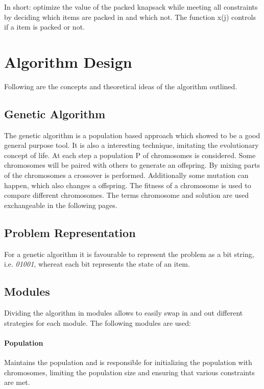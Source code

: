 \documentclass[a4paper]{article}
\begin{document}
In short: optimize the value of the packed knapsack while meeting all constraints by deciding which items are packed in and which not. The function x(j) controls if a item is packed or not. 

\section{Algorithm Design}

Following are the concepts and theoretical ideas of the algorithm outlined.

\subsection{Genetic Algorithm}

The genetic algorithm is a population based approach which showed to be a good general purpose tool. It is also a interesting technique, imitating the evolutionary concept of life. At each step a population P of chromosomes is considered. Some chromosomes will be paired with others to generate an offspring. By mixing parts of the chromosomes a crossover is performed. Additionally some mutation can happen, which also changes a offspring. The fitness of a chromosome is used to compare different chromosomes. The terms chromosome and solution are used exchangeable in the following pages.

\subsection{Problem Representation}

For a genetic algorithm it is favourable to represent the problem as a bit string, i.e. \emph{01001}, whereat each bit represents the state of an item.

\subsection{Modules}

Dividing the algorithm in modules allows to easily swap in and out different strategies for each module. The following modules are used:

\paragraph{Population} 

Maintains the population and is responsible for initializing the population with chromosomes, limiting the population size and ensuring that various constraints are met. 
\end{document}
